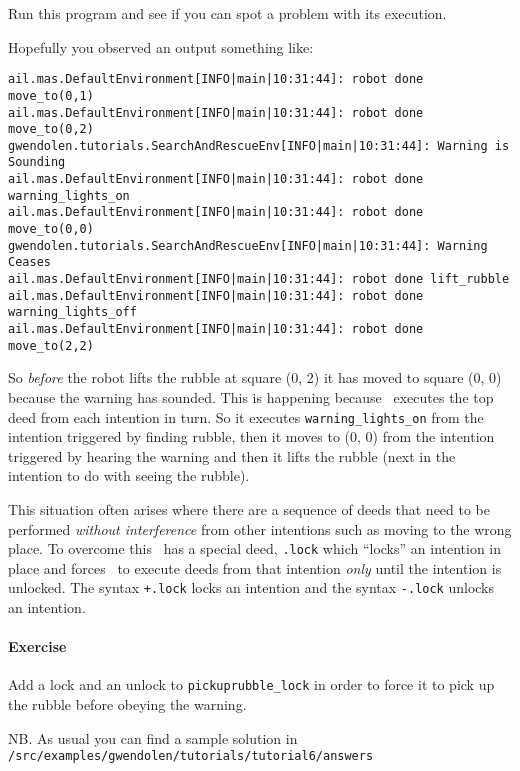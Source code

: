 Run this program and see if you can spot a problem with its execution.

Hopefully you observed an output something like:
\begin{verbatim}
ail.mas.DefaultEnvironment[INFO|main|10:31:44]: robot done move_to(0,1) 
ail.mas.DefaultEnvironment[INFO|main|10:31:44]: robot done move_to(0,2) 
gwendolen.tutorials.SearchAndRescueEnv[INFO|main|10:31:44]: Warning is Sounding 
ail.mas.DefaultEnvironment[INFO|main|10:31:44]: robot done warning_lights_on 
ail.mas.DefaultEnvironment[INFO|main|10:31:44]: robot done move_to(0,0) 
gwendolen.tutorials.SearchAndRescueEnv[INFO|main|10:31:44]: Warning Ceases 
ail.mas.DefaultEnvironment[INFO|main|10:31:44]: robot done lift_rubble 
ail.mas.DefaultEnvironment[INFO|main|10:31:44]: robot done warning_lights_off 
ail.mas.DefaultEnvironment[INFO|main|10:31:44]: robot done move_to(2,2) 
\end{verbatim}
So \emph{before} the robot lifts the rubble at square (0, 2) it has
moved to square (0, 0) because the warning has sounded.  This is
happening because \gwendolen\ executes the top deed from each
intention in turn.  So it executes \lstinline{warning_lights_on} from
the intention triggered by finding rubble, then it moves to (0, 0)
from the intention triggered by hearing the warning and then it lifts
the rubble (next in the intention to do with seeing the
rubble). 

This situation often arises where there are a sequence of deeds that
need to be performed \emph{without interference} from other intentions
such as moving to the wrong place.  To overcome this \gwendolen\ has a
special deed, \lstinline{.lock} which ``locks'' an intention in place
and forces \gwendolen\ to execute deeds from that intention
\emph{only} until the intention is unlocked.  The syntax
\lstinline{+.lock} locks an intention and the syntax
\lstinline{-.lock} unlocks an
intention. 

\paragraph{Exercise} Add a lock and an unlock to
\verb+pickuprubble_lock+ in order to force it to pick up the rubble
before obeying the warning. 

\begin{sloppypar}
NB. As usual you can find a sample solution in \texttt{/src/examples/gwendolen/tutorials/tutorial6/answers}
\end{sloppypar}

